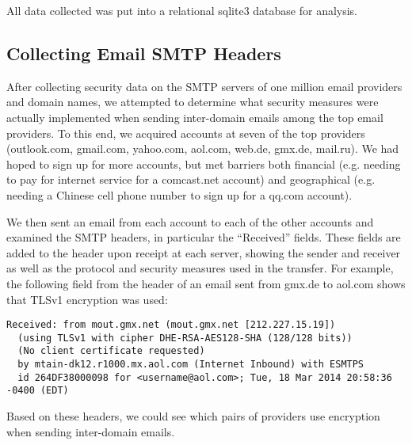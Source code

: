 All data collected was put into a relational sqlite3 database for analysis.

\subsection{Collecting Email SMTP Headers}
After collecting security data on the SMTP servers of one million email providers and domain names, we attempted to determine what security measures were actually implemented when sending inter-domain emails among the top email providers.  To this end, we acquired accounts at seven of the top providers (outlook.com, gmail.com, yahoo.com, aol.com, web.de, gmx.de, mail.ru).  We had hoped to sign up for more accounts, but met barriers both financial (e.g. needing to pay for internet service for a comcast.net account) and geographical (e.g. needing a Chinese cell phone number to sign up for a qq.com account).

We then sent an email from each account to each of the other accounts and examined the SMTP headers, in particular the “Received” fields.  These fields are added to the header upon receipt at each server, showing the sender and receiver as well as the protocol and security measures used in the transfer.  For example, the following field from the header of an email sent from gmx.de to aol.com shows that TLSv1 encryption was used:

\begin{verbatim}
Received: from mout.gmx.net (mout.gmx.net [212.227.15.19])
  (using TLSv1 with cipher DHE-RSA-AES128-SHA (128/128 bits))
  (No client certificate requested)
  by mtain-dk12.r1000.mx.aol.com (Internet Inbound) with ESMTPS
  id 264DF38000098 for <username@aol.com>; Tue, 18 Mar 2014 20:58:36 -0400 (EDT)
\end{verbatim}

Based on these headers, we could see which pairs of providers use encryption when sending inter-domain emails.

